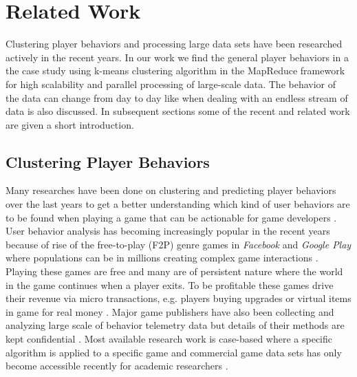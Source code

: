 
\chapter{Related Work} %
\label{Chapter3}

Clustering player behaviors and processing large data sets have been researched actively in the recent years. In our work we find the general player behaviors in a the case study using k-means clustering algorithm in the MapReduce framework for high scalability and parallel processing of large-scale data. The behavior of the data can change from day to day like when dealing with an endless stream of data is also discussed. In subsequent sections some of the recent and related work are given a short introduction.

\section{Clustering Player Behaviors}
Many researches have been done on clustering and predicting player behaviors over the last years to get a better understanding which kind of user behaviors are to be found when playing a game that can be actionable for game developers \citep{Marsh:2006Continuous, Missura2009Player, Thurau:2009SVIM, Drachen:2011Evaluating, Drachen:2012}. User behavior analysis has becoming increasingly popular in the recent years because of rise of the free-to-play (F2P) genre games in \textit{Facebook} and \textit{Google Play} where populations can be in millions creating complex game interactions \citep{Kim:2008Tracking, Drachen:2011Evaluating}. Playing these games are free and many are of persistent nature where the world in the game continues when a player exits. To be profitable these games drive their revenue via micro transactions, e.g. players buying upgrades or virtual items in game for real money \citep{Kim:2008Tracking, Drachen:2011Evaluating, Fields:2011SocialGame, Seif:2013GameAnalytics}. Major game publishers have also been collecting and analyzing large scale of behavior telemetry data but details of their methods are kept confidential \citep{Zoeller:2010, Yannakakis:2012}. Most available research work is case-based where a specific algorithm is applied to a specific game and commercial game data sets has only become accessible recently for academic researchers \citep{Yannakakis:2012}.

